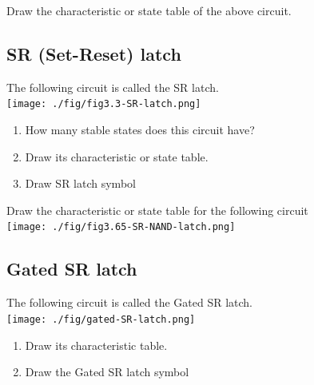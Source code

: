 \begin{definition}
\end{definition}
\vspace{5em}

\begin{definition}
  Draw the characteristic or state table of the above circuit. 
\end{definition}
\vspace{10em}



\subsection{SR (Set-Reset) latch \cite[Sec~3.2.1]{harris2022digital}}

\begin{definition}[SR latch]
  The following circuit is called the SR latch. \\
  \texttt{[image: ./fig/fig3.3-SR-latch.png]} \\
  \begin{enumerate}
    \item How many stable states does this circuit have?
    \item Draw its characteristic or state table.
    \item Draw SR latch symbol
  \end{enumerate}
\end{definition}
\vspace{20em}


\begin{prob}
Draw the characteristic or state table for the following circuit\\
  \texttt{[image: ./fig/fig3.65-SR-NAND-latch.png]} \\
\end{prob}

\subsection{Gated SR latch \cite[Sec~5.2]{stephen2022fundamentals}}

\begin{definition}
  The following circuit is called the Gated SR latch. \\
  \texttt{[image: ./fig/gated-SR-latch.png]} \\
  \begin{enumerate}
  \item Draw its characteristic table.
  \item Draw the Gated SR latch symbol
  \end{enumerate}
\end{definition}
\vspace{20em}

